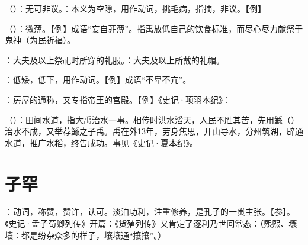 {
\item {}（）：无可非议。：本义为空隙，用作动词，挑毛病，指摘，非议。【例】 
\item {}（）：微薄。【例】成语“妄自菲薄”。指禹放低自己的饮食标准，而尽心尽力献祭于鬼神（为民祈福）。

\item {}：大夫及以上祭祀时所穿的礼服。：大夫及以上所戴的礼帽。
\item {}：低矮，低下，用作动词。【例】成语“不卑不亢”。
\item {}：房屋的通称，又专指帝王的宫殿。【例】《史记·项羽本纪》：

\item {}（）：田间水道，指大禹治水一事。相传时洪水滔天，人民不胜其苦，先用鲧（）治水不成，又举荐鲧之子禹。禹在外13年，劳身焦思，开山导水，分州筑湖，辟通水道，推广水稻，终告成功。事见《史记·夏本纪》。
}
{}



\chapter{子罕}

{
\item {}：动词，称赞，赞许，认可。淡泊功利，注重修养，是孔子的一贯主张。【参】。《史记·孟子荀卿列传》开篇：《货殖列传》又肯定了逐利乃世间常态：（熙熙、壤壤：都是纷杂众多的样子，壤壤通“攘攘”。）
}
{}  %


